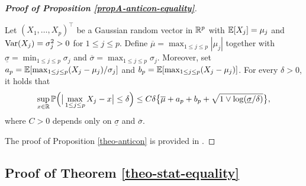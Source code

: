 \documentclass[a4paper,12pt]{article}
\begin{document}
\begin{proof}[\textnormal{\textbf{Proof of Proposition \ref{propA-anticon-equality}}}]
{\begin{propA}\label{theo-anticon}
Let $(X_1,\ldots,X_p)^\top$ be a Gaussian random vector in $\mathbb{R}^p$ with $\mathbb{E}[X_j] = \mu_j$ and $\textnormal{Var}(X_j) = \sigma_j^2 > 0$ for $1 \le j \le p$. Define $\overline{\mu} = \max_{1 \le j \le p} |\mu_j|$ together with $\underline{\sigma} = \min_{1 \le j \le p} \sigma_j$ and $\overline{\sigma} = \max_{1 \le j \le p} \sigma_j$. Moreover, set $a_p = \mathbb{E}[ \max_{1 \le j \le p} (X_j-\mu_j)/\sigma_j ]$ and $b_p = \mathbb{E}[ \max_{1 \le j \le p} (X_j-\mu_j) ]$. For every $\delta > 0$, it holds that
\[ \sup_{x \in \mathbb{R}} \mathbb{P} \Big( \big| \max_{1 \le j \le p} X_j - x \big| \le \delta \Big) \le C \delta \big\{ \overline{\mu} + a_p + b_p + \sqrt{1 \vee \log(\underline{\sigma}/\delta)} \big\}, \]
where $C > 0$ depends only on $\underline{\sigma}$ and $\overline{\sigma}$. 
\end{propA} 
The proof of Proposition \ref{theo-anticon} is provided in \cite{KhismatullinaVogt2018}.}
\end{proof}



\subsection*{Proof of Theorem \ref{theo-stat-equality}}
\end{document}
